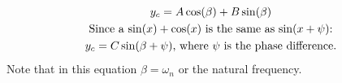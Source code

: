 \documentclass[11pt, a4paper]{article}
\begin{document}
\begin{gather}
  y_c = A\cos(\beta) + B\sin(\beta)\\
  \text{Since a $\sin(x) + \cos(x)$ is the same as $\sin(x+\psi)$:}\notag \\
  y_c = C\sin(\beta + \psi)\text{, where $\psi$ is the phase difference.}
\end{gather}
Note that in this equation $\beta = \omega_n$ or the natural frequency.
\end{document}
